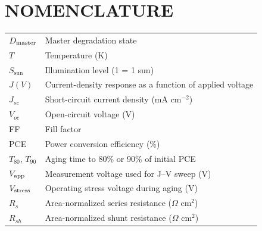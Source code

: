 \chapter*{NOMENCLATURE}

\begin{tabular}{@{}p{}p{}@{}}
$D_{\mathrm{master}}$ & Master degradation state \\
$T$ & Temperature (K) \\
$S_{\mathrm{sun}}$ & Illumination level (1 = 1 sun) \\
$J(V)$ & Current-density response as a function of applied voltage \\
$J_{sc}$ & Short-circuit current density (mA cm$^{-2}$) \\
$V_{oc}$ & Open-circuit voltage (V) \\
FF & Fill factor \\
PCE & Power conversion efficiency (\%) \\
$T_{80}$, $T_{90}$ & Aging time to 80\% or 90\% of initial PCE \\
$V_{\mathrm{app}}$ & Measurement voltage used for J--V sweep (V) \\
$V_{\mathrm{stress}}$ & Operating stress voltage during aging (V) \\
$R_s$ & Area-normalized series resistance ($\Omega$ cm$^2$) \\
$R_{sh}$ & Area-normalized shunt resistance ($\Omega$ cm$^2$) \\
\end{tabular}

\clearpage

